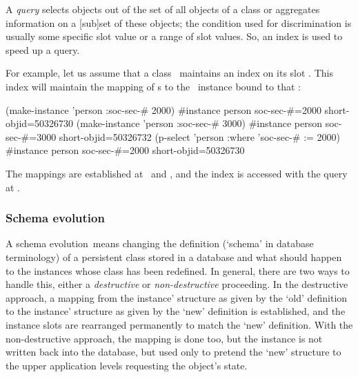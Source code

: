 A \emph{query} selects objects out of the set of all objects of a
class or aggregates information on a [sub]set of these objects; the
condition used for discrimination is usually some specific slot value
or a range of slot values. So, an index is used to speed up a query.

For example, let us assume that a class \ maintains an
index on its slot . This index will maintain the
mapping of s to the \ instance bound to
that :
\begin{CompactCode}
\listener{}(make-instance 'person :soc-sec-# 2000)\marginnumber{\smalloi}
#\lt{}instance person soc-sec-#=2000 short-objid=50326730\gt
\listener{}(make-instance 'person :soc-sec-# 3000)\marginnumber{\smalloii}
#\lt{}instance person soc-sec-#=3000 short-objid=50326732\gt
\listener{}(p-select 'person :where 'soc-sec-# := 2000)\marginnumber{\smalloiii}
#\lt{}instance person soc-sec-#=2000 short-objid=50326730\gt
\end{CompactCode}

The mappings are established at \oi\ and \oii, and the index is
accessed with the query at \oiii.

\subsubsection{Schema evolution}%
\label{sec:DefinitionOfSchemaEvolution}

A \hypertarget{link:SchemaEvolution}{schema evolution}\ means changing
the definition (`schema' in database terminology) of a persistent
class stored in a database and what should happen to the instances
whose class has been redefined. In general, there are two ways to
handle this, either a \emph{destructive} or \emph{non-destructive}
proceeding. In the destructive approach, a mapping from the
instance' structure as given by the `old' definition to the instance'
structure as given by the `new' definition is established, and the
instance slots are rearranged permanently to match the `new'
definition. With the non-destructive approach, the mapping is done
too, but the instance is not written back into the database, but used
only to pretend the `new' structure to the upper application levels
requesting the object's state.

